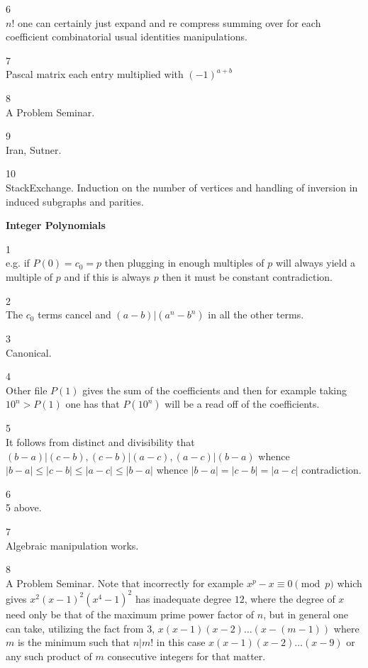 6 \\
$\boxed{n!}$ one can certainly just expand and re compress summing over for each coefficient combinatorial usual identities manipulations.

7 \\
Pascal matrix each entry multiplied with $(-1)^{a+b}$

8 \\
A Problem Seminar.

9 \\
Iran, Sutner.

10 \\
StackExchange. Induction on the number of vertices and handling of inversion in induced subgraphs and parities.

\newpage

\textbf{Integer Polynomials}

1 \\
e.g. if $P(0)=c_0=p$ then plugging in enough multiples of $p$ will always yield a multiple of $p$ and if this is always $p$ then it must be constant contradiction.

2 \\
The $c_0$ terms cancel and $(a-b)|(a^n-b^n)$ in all the other terms.

3 \\
Canonical.

4 \\
Other file $P(1)$ gives the sum of the coefficients and then for example taking $10^n>P(1)$ one has that $P(10^n)$ will be a read off of the coefficients.

5 \\
It follows from distinct and divisibility that $(b-a)|(c-b),(c-b)|(a-c),(a-c)|(b-a)$ whence $|b-a| \le |c-b| \le |a-c| \le |b-a|$ whence $|b-a|=|c-b|=|a-c|$ contradiction.

6 \\
5 above.

7 \\
Algebraic manipulation works.

8 \\
A Problem Seminar. Note that incorrectly for example $x^p-x \equiv 0 \pmod{p}$ which gives $x^2(x-1)^2(x^4-1)^2$ has inadequate degree $12$, where the degree of $x$ need only be that of the maximum prime power factor of $n$, but in general one can take, utilizing the fact from 3, $x(x-1)(x-2)\dots (x-(m-1))$ where $m$ is the minimum such that $n|m!$ in this case $x(x-1)(x-2)\dots (x-9)$ or any such product of $m$ consecutive integers for that matter.

